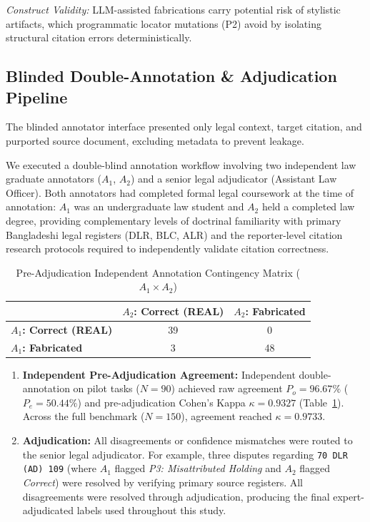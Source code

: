 \documentclass[conference]{IEEEtran}
\begin{document}
\textit{Construct Validity:} LLM-assisted fabrications carry potential risk of stylistic artifacts, which programmatic locator mutations (P2) avoid by isolating structural citation errors deterministically.

\subsection{Blinded Double-Annotation \& Adjudication Pipeline}
The blinded annotator interface presented only legal context, target citation, and purported source document, excluding metadata to prevent leakage. 

We executed a double-blind annotation workflow involving two independent law graduate annotators ($A_1$, $A_2$) and a senior legal adjudicator (Assistant Law Officer). Both annotators had completed formal legal coursework at the time of annotation: $A_1$ was an undergraduate law student and $A_2$ held a completed law degree, providing complementary levels of doctrinal familiarity with primary Bangladeshi legal registers (DLR, BLC, ALR) and the reporter-level citation research protocols required to independently validate citation correctness.

\begin{table}[htbp]
\caption{Pre-Adjudication Independent Annotation Contingency Matrix ($A_1 \times A_2$)}
\label{tab:annotation_contingency}
\centering
\begin{tabular}{lcc}
\toprule
 & \textbf{$A_2$: Correct (REAL)} & \textbf{$A_2$: Fabricated} \\
\midrule
\textbf{$A_1$: Correct (REAL)} & 39 & 0 \\
\textbf{$A_1$: Fabricated} & 3 & 48 \\
\bottomrule
\end{tabular}
\end{table}

\begin{enumerate}
\item \textbf{Independent Pre-Adjudication Agreement:} Independent double-annotation on pilot tasks ($N=90$) achieved raw agreement $P_o = 96.67\%$ ($P_e = 50.44\%$) and pre-adjudication Cohen's Kappa $\kappa = 0.9327$ (Table~\ref{tab:annotation_contingency}). Across the full benchmark ($N=150$), agreement reached $\kappa = 0.9733$.
\item \textbf{Adjudication:} All disagreements or confidence mismatches were routed to the senior legal adjudicator. For example, three disputes regarding \texttt{70 DLR (AD) 109} (where $A_1$ flagged \textit{P3: Misattributed Holding} and $A_2$ flagged \textit{Correct}) were resolved by verifying primary source registers. All disagreements were resolved through adjudication, producing the final expert-adjudicated labels used throughout this study.
\end{enumerate}
\end{document}
